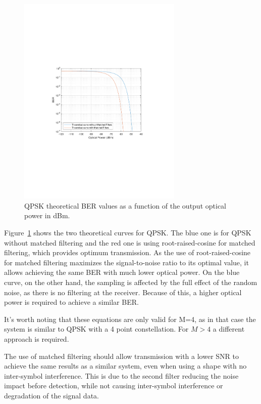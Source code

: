 \begin{refsection}
\begin{figure}[H]
	\centering
	\includegraphics[clip, trim=4cm 8cm 4cm 8cm, width=0.7\textwidth]{./sdf/m_qam_system/figures/teor_BER_curves.pdf}
	\caption{QPSK theoretical BER values as a function of the output optical power in dBm.\label{fig:QPSK_th_curves}}
\end{figure}


Figure~\ref{fig:QPSK_th_curves} shows the two theoretical curves for QPSK. The blue one is for QPSK without matched filtering and the red one is using root-raised-cosine for matched filtering, which provides optimum transmission. As the use of root-raised-cosine for matched filtering maximizes the signal-to-noise ratio to its optimal value, it allows achieving the same BER with much lower optical power. On the blue curve, on the other hand, the sampling is affected by the full effect of the random noise, as there is no filtering at the receiver. Because of this, a higher optical power is required to achieve a similar BER.


It's worth noting that these equations are only valid for M=4, as in that case the system is similar to QPSK with a 4 point constellation. For $M > 4$ a different approach is required.

The use of matched filtering should allow transmission with a lower SNR to achieve the same results as a similar system, even when using a shape with no inter-symbol interference. This is due to the second filter reducing the noise impact before detection, while not causing inter-symbol interference or degradation of the signal data.


\end{refsection}
